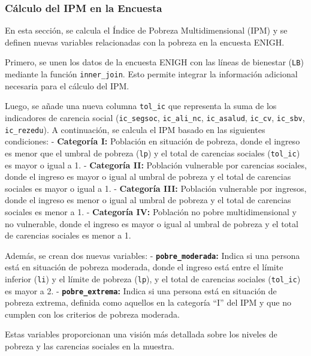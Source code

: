 \documentclass[
  12pt,
]{book}
\begin{document}
\hypertarget{cuxe1lculo-del-ipm-en-la-encuesta}{%
\subsubsection*{Cálculo del IPM en la Encuesta}\label{cuxe1lculo-del-ipm-en-la-encuesta}}

En esta sección, se calcula el Índice de Pobreza Multidimensional (IPM) y se definen nuevas variables relacionadas con la pobreza en la encuesta ENIGH.

Primero, se unen los datos de la encuesta ENIGH con las líneas de bienestar (\texttt{LB}) mediante la función \texttt{inner\_join}. Esto permite integrar la información adicional necesaria para el cálculo del IPM.

Luego, se añade una nueva columna \texttt{tol\_ic} que representa la suma de los indicadores de carencia social (\texttt{ic\_segsoc}, \texttt{ic\_ali\_nc}, \texttt{ic\_asalud}, \texttt{ic\_cv}, \texttt{ic\_sbv}, \texttt{ic\_rezedu}). A continuación, se calcula el IPM basado en las siguientes condiciones:
- \textbf{Categoría I:} Población en situación de pobreza, donde el ingreso es menor que el umbral de pobreza (\texttt{lp}) y el total de carencias sociales (\texttt{tol\_ic}) es mayor o igual a 1.
- \textbf{Categoría II:} Población vulnerable por carencias sociales, donde el ingreso es mayor o igual al umbral de pobreza y el total de carencias sociales es mayor o igual a 1.
- \textbf{Categoría III:} Población vulnerable por ingresos, donde el ingreso es menor o igual al umbral de pobreza y el total de carencias sociales es menor a 1.
- \textbf{Categoría IV:} Población no pobre multidimensional y no vulnerable, donde el ingreso es mayor o igual al umbral de pobreza y el total de carencias sociales es menor a 1.

Además, se crean dos nuevas variables:
- \textbf{\texttt{pobre\_moderada}:} Indica si una persona está en situación de pobreza moderada, donde el ingreso está entre el límite inferior (\texttt{li}) y el límite de pobreza (\texttt{lp}), y el total de carencias sociales (\texttt{tol\_ic}) es mayor a 2.
- \textbf{\texttt{pobre\_extrema}:} Indica si una persona está en situación de pobreza extrema, definida como aquellos en la categoría ``I'' del IPM y que no cumplen con los criterios de pobreza moderada.

Estas variables proporcionan una visión más detallada sobre los niveles de pobreza y las carencias sociales en la muestra.
\end{document}
